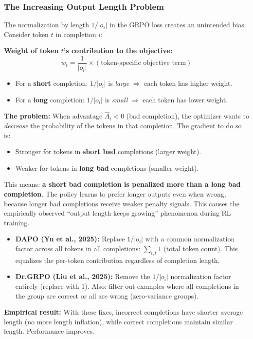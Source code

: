 \documentclass[11pt, a4paper]{article}
\begin{document}
\subsubsection{The Increasing Output Length Problem}

\begin{warnbox}
The normalization by length $1/|o_i|$ in the GRPO loss creates an unintended bias. Consider token $t$ in completion $i$:

\textbf{Weight of token $t$'s contribution to the objective:}
\[
w_t = \frac{1}{|o_i|} \times (\text{token-specific objective term})
\]
\begin{itemize}[leftmargin=1.5em]
  \item For a \textbf{short} completion: $1/|o_i|$ is \emph{large} $\Rightarrow$ each token has higher weight.
  \item For a \textbf{long} completion: $1/|o_i|$ is \emph{small} $\Rightarrow$ each token has lower weight.
\end{itemize}

\textbf{The problem:} When advantage $\hat{A}_i < 0$ (bad completion), the optimizer wants to \emph{decrease} the probability of the tokens in that completion. The gradient to do so is:
\begin{itemize}[leftmargin=1.5em]
  \item Stronger for tokens in \textbf{short bad} completions (larger weight).
  \item Weaker for tokens in \textbf{long bad} completions (smaller weight).
\end{itemize}
This means: \textbf{a short bad completion is penalized more than a long bad completion}. The policy learns to prefer longer outputs even when wrong, because longer bad completions receive weaker penalty signals. This causes the empirically observed ``output length keeps growing'' phenomenon during RL training.
\end{warnbox}

\begin{notebox}
\begin{itemize}[leftmargin=1.5em]
  \item \textbf{DAPO (Yu et al., 2025):} Replace $1/|o_i|$ with a common normalization factor across all tokens in all completions: $\sum_{i,t} 1$ (total token count). This equalizes the per-token contribution regardless of completion length.
  \item \textbf{Dr.GRPO (Liu et al., 2025):} Remove the $1/|o_i|$ normalization factor entirely (replace with 1). Also: filter out examples where all completions in the group are correct or all are wrong (zero-variance groups).
\end{itemize}
\textbf{Empirical result:} With these fixes, incorrect completions have shorter average length (no more length inflation), while correct completions maintain similar length. Performance improves.
\end{notebox}
\end{document}
